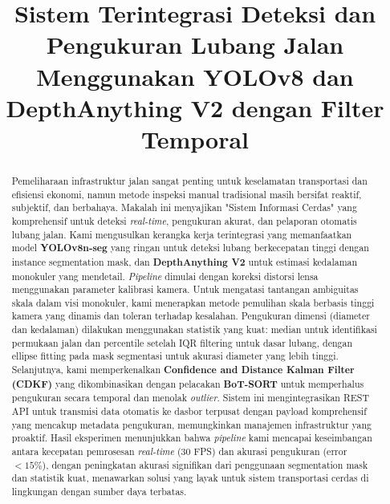\documentclass[conference]{IEEEtran}
\begin{document}
\title{Sistem Terintegrasi Deteksi dan Pengukuran Lubang Jalan Menggunakan YOLOv8 dan DepthAnything V2 dengan Filter Temporal}

\author{
}
\maketitle

\begin{abstract}
Pemeliharaan infrastruktur jalan sangat penting untuk keselamatan transportasi dan efisiensi ekonomi, namun metode inspeksi manual tradisional masih bersifat reaktif, subjektif, dan berbahaya. Makalah ini menyajikan "Sistem Informasi Cerdas" yang komprehensif untuk deteksi \textit{real-time}, pengukuran akurat, dan pelaporan otomatis lubang jalan. Kami mengusulkan kerangka kerja terintegrasi yang memanfaatkan model \textbf{YOLOv8n-seg} yang ringan untuk deteksi lubang berkecepatan tinggi dengan instance segmentation mask, dan \textbf{DepthAnything V2} untuk estimasi kedalaman monokuler yang mendetail. \textit{Pipeline} dimulai dengan koreksi distorsi lensa menggunakan parameter kalibrasi kamera. Untuk mengatasi tantangan ambiguitas skala dalam visi monokuler, kami menerapkan metode pemulihan skala berbasis tinggi kamera yang dinamis dan toleran terhadap kesalahan. Pengukuran dimensi (diameter dan kedalaman) dilakukan menggunakan statistik yang kuat: median untuk identifikasi permukaan jalan dan percentile setelah IQR filtering untuk dasar lubang, dengan ellipse fitting pada mask segmentasi untuk akurasi diameter yang lebih tinggi. Selanjutnya, kami memperkenalkan \textbf{Confidence and Distance Kalman Filter (CDKF)} yang dikombinasikan dengan pelacakan \textbf{BoT-SORT} untuk memperhalus pengukuran secara temporal dan menolak \textit{outlier}. Sistem ini mengintegrasikan REST API untuk transmisi data otomatis ke dasbor terpusat dengan payload komprehensif yang mencakup metadata pengukuran, memungkinkan manajemen infrastruktur yang proaktif. Hasil eksperimen menunjukkan bahwa \textit{pipeline} kami mencapai keseimbangan antara kecepatan pemrosesan \textit{real-time} (30 FPS) dan akurasi pengukuran (error $< 15\%$), dengan peningkatan akurasi signifikan dari penggunaan segmentation mask dan statistik kuat, menawarkan solusi yang layak untuk sistem transportasi cerdas di lingkungan dengan sumber daya terbatas.
\end{abstract}
\end{document}
